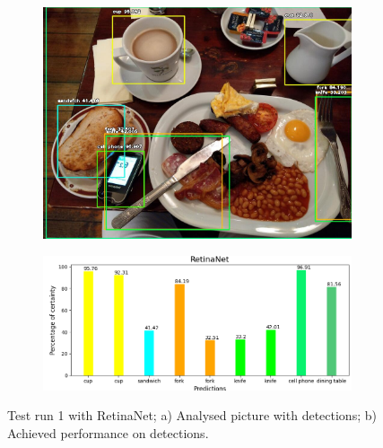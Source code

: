       \begin{figure}[H]
        \centering
        \captionsetup{justification=centering}

        \begin{subfigure}{0.29\textwidth}
        \includegraphics[width=\textwidth]{Sections/4InitialWork/4_images_obj_run1/retinaNet.jpg} 
        \caption{}
        \end{subfigure}
        \begin{subfigure}{0.65\textwidth}
        \includegraphics[width=\textwidth]{Sections/4InitialWork/4_images_obj_run1/retinaNet_graph.png}
        \caption{}
        \end{subfigure}
        
        \caption[Test run 1 with RetinaNet]{ 
        Test run 1 with RetinaNet; a) Analysed picture with detections; b) Achieved performance on detections. }
        \end{figure}
    

